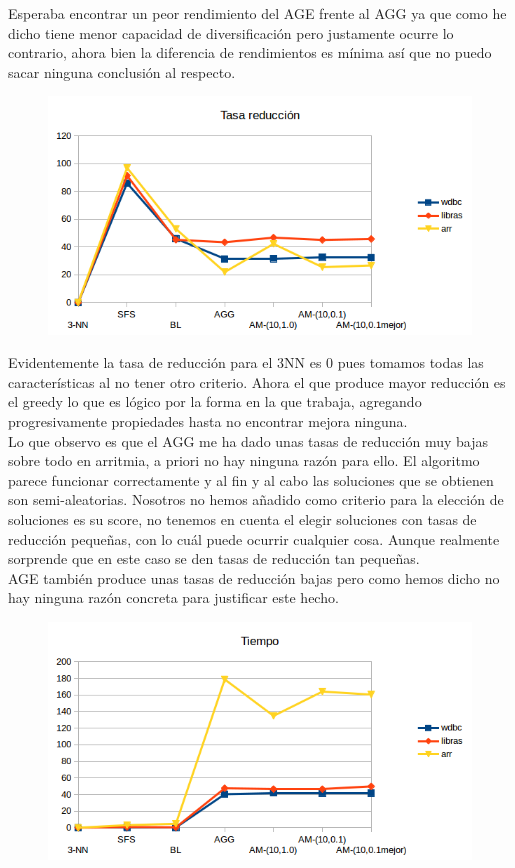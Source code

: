 \documentclass[10pt,a4paper]{article}
\begin{document}
Esperaba encontrar un peor rendimiento del AGE frente al AGG ya que como he dicho tiene menor capacidad de diversificación pero justamente ocurre lo contrario, ahora bien la diferencia de rendimientos es mínima así que no puedo sacar ninguna conclusión al respecto.\\


\begin{figure}[H]
\centering
\includegraphics[width=130mm]{reduccion_am.png}
\end{figure}

Evidentemente la tasa de reducción para el 3NN es 0 pues tomamos todas las características al no tener otro criterio. Ahora el que produce mayor reducción es el greedy lo que es lógico por la forma en la que trabaja, agregando progresivamente propiedades hasta no encontrar mejora ninguna.\\

Lo que observo es que el AGG me ha dado unas tasas de reducción muy bajas sobre todo en arritmia, a priori no hay ninguna razón para ello. El algoritmo parece funcionar correctamente y al fin y al cabo las soluciones que se obtienen son semi-aleatorias. Nosotros no hemos añadido como criterio para la elección de soluciones es su score, no tenemos en cuenta el elegir soluciones con tasas de reducción pequeñas, con lo cuál puede ocurrir cualquier cosa. Aunque realmente sorprende que en este caso se den tasas de reducción tan pequeñas.\\

AGE también produce unas tasas de reducción bajas pero como hemos dicho no hay ninguna razón concreta para justificar este hecho.\\


\begin{figure}[H]
\centering
\includegraphics[width=130mm]{tiempo_am.png}
\end{figure}
\end{document}
